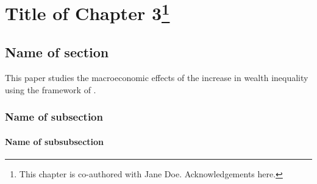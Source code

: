 \graphicspath{{4_chapter/figures/}}

\renewcommand*{\thefootnote}{\fnsymbol{footnote}}
\chapter[Title of Chapter 3]{Title of Chapter 3\footnote{\noindent
This chapter is co-authored with Jane Doe. Acknowledgements here.}}
\label{chapter:chapter3-alias}
\newpage

\setcounter{footnote}{0}
\renewcommand*{\thefootnote}{\arabic{footnote}}

\section{\label{}Name of section}

This paper studies the macroeconomic effects of the increase in wealth inequality using the framework of \citet{krusell1998income}. \lipsum[1-2]




\lipsum[3-4]

\subsection{\label{}Name of subsection}

\lipsum[5-6]



\lipsum[7-8]

\subsubsection{\label{}Name of subsubsection}

\lipsum[9-10]

\newpage{}
\printbibliography[segment=0,heading=subbibintoc]

\newpage{}
\begin{subappendices}
\newrefsegment %

\end{subappendices}
